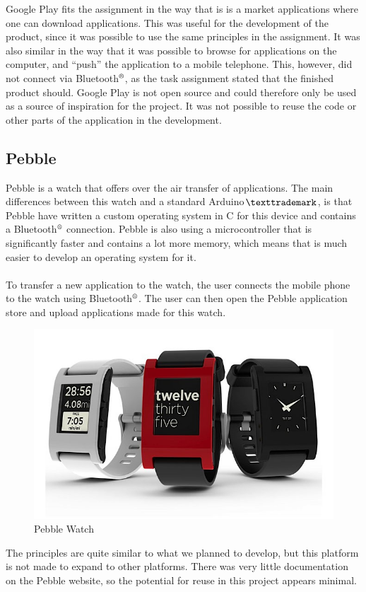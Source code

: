 Google Play fits the assignment in the way that is is a market applications where one can download applications. This was useful for the development of the product, since it was possible to use the same principles in the assignment. It was also similar in the way that it was possible to browse for applications on the computer, and ``push'' the application to a mobile telephone. This, however, did not connect via Bluetooth$\textsuperscript{\textregistered}$, as the task assignment stated that the finished product should. Google Play is not open source and could therefore only be used as a source of inspiration for the project. It was not possible to reuse the code or other parts of the application in the development.


\subsection{Pebble}
Pebble is a watch that offers over the air transfer of applications. The main differences between this watch and a standard Arduino$\texttrademark$, is that Pebble have written a custom operating system in C for this device and contains a Bluetooth$\textsuperscript{\textregistered}$ connection. Pebble is also using a microcontroller that is significantly faster and contains a lot more memory, which means that is much easier to develop an operating system for it.\\
\\
To transfer a new application to the watch, the user connects the mobile phone to the watch using Bluetooth$\textsuperscript{\textregistered}$. The user can then open the Pebble application store and upload applications made for this watch.

\begin{figure}[H]
\includegraphics[scale=0.7]{images/Pebble-Smartphone-Watch.jpeg}
\caption{Pebble Watch}
\end{figure}
The principles are quite similar to what we planned to develop, but this platform is not made to expand to other platforms. There was very little documentation on the Pebble website, so the potential for reuse in this project appears minimal.

